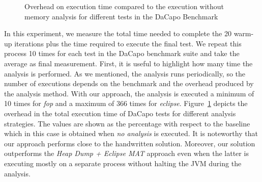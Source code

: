 \begin{figure}[b]
\centering
{}
\caption{Overhead on execution time compared to the execution without memory analysis for different tests in the DaCapo Benchmark\label{fig:evaluationTotalTime}}
\end{figure}

In this experiment, we measure the total time needed to complete the 20 warm-up iterations plus the time required to execute the final test.
We repeat this process 10 times for each test in the DaCapo benchmark suite and take the average as final measurement.
First, it is useful to highlight how many time the analysis is performed.
As we mentioned, the analysis runs periodically, so the number of executions depends on the benchmark and the overhead produced by the analysis method.
With our approach, the analysis is executed a minimum of 10 times for \textit{fop} and a maximum of  366 times for \textit{eclipse}.
Figure~\ref{fig:evaluationTotalTime} depicts the overhead in the total execution time of DaCapo tests for different analysis strategies.
The values are shown as the percentage with respect to the baseline which in this case is obtained when \textit{no analysis} is executed.
It is noteworthy that our approach performs close to the handwritten solution.
Moreover, our solution outperforms the \textit{Heap Dump + Eclipse MAT} approach even when the latter is executing mostly on a separate process without halting the JVM during the analysis.

